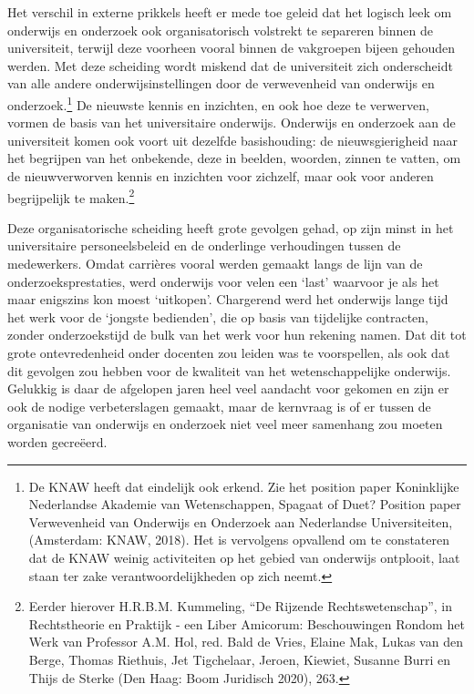 \documentclass{jote-book}
\begin{document}
	Het verschil in externe prikkels heeft er mede toe geleid dat het logisch leek om onderwijs en onderzoek ook organisatorisch volstrekt te separeren binnen de universiteit, terwijl deze voorheen vooral binnen de vakgroepen bijeen gehouden werden. Met deze scheiding wordt miskend dat de universiteit zich onderscheidt van alle andere onderwijsinstellingen door de verwevenheid van onderwijs en onderzoek.\footnote{De KNAW heeft dat eindelijk ook erkend. Zie het position paper Koninklijke Nederlandse Akademie van Wetenschappen, Spagaat of Duet? Position paper Verwevenheid van Onderwijs en Onderzoek aan Nederlandse Universiteiten, (Amsterdam: KNAW, 2018). Het is vervolgens opvallend om te constateren dat de KNAW weinig activiteiten op het gebied van onderwijs ontplooit, laat staan ter zake verantwoordelijkheden op zich neemt.} De nieuwste kennis en inzichten, en ook hoe deze te verwerven, vormen de basis van het universitaire onderwijs. Onderwijs en onderzoek aan de universiteit komen ook voort uit dezelfde basishouding: de nieuwsgierigheid naar het begrijpen van het onbekende, deze in beelden, woorden, zinnen te vatten, om de nieuwverworven kennis en inzichten voor zichzelf, maar ook voor anderen begrijpelijk te maken.\footnote{Eerder hierover H.R.B.M. Kummeling, “De Rijzende Rechtswetenschap”, in Rechtstheorie en Praktijk - een Liber Amicorum: Beschouwingen Rondom het Werk van Professor A.M. Hol, red. Bald de Vries, Elaine Mak, Lukas van den Berge, Thomas Riethuis, Jet Tigchelaar, Jeroen, Kiewiet, Susanne Burri en Thijs de Sterke (Den Haag: Boom Juridisch 2020), 263.}



	Deze organisatorische scheiding heeft grote gevolgen gehad, op zijn minst in het universitaire personeelsbeleid en de onderlinge verhoudingen tussen de medewerkers. Omdat carrières vooral werden gemaakt langs de lijn van de onderzoeksprestaties, werd onderwijs voor velen een ‘last' waarvoor je als het maar enigszins kon moest ‘uitkopen'. Chargerend werd het onderwijs lange tijd het werk voor de ‘jongste bedienden', die op basis van tijdelijke contracten, zonder onderzoekstijd de bulk van het werk voor hun rekening namen. Dat dit tot grote ontevredenheid onder docenten zou leiden was te voorspellen, als ook dat dit gevolgen zou hebben voor de kwaliteit van het wetenschappelijke onderwijs. Gelukkig is daar de afgelopen jaren heel veel aandacht voor gekomen en zijn er ook de nodige verbeterslagen gemaakt, maar de kernvraag is of er tussen de organisatie van onderwijs en onderzoek niet veel meer samenhang zou moeten worden gecreëerd.
\end{document}

